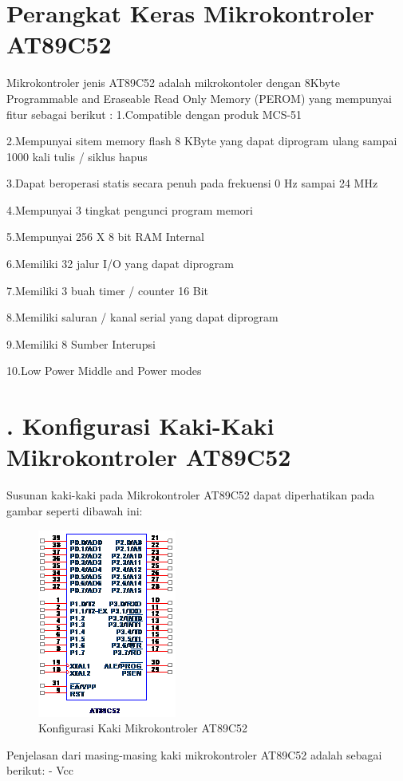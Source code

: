 \documentclass{jtetiproposalskripsi}
\begin{document}
\section{Perangkat Keras Mikrokontroler AT89C52 }
Mikrokontroler jenis AT89C52 adalah mikrokontoler dengan 8Kbyte Programmable and Eraseable Read Only Memory (PEROM) yang mempunyai fitur sebagai berikut :
1.Compatible dengan produk MCS-51

2.Mempunyai sitem memory flash 8 KByte yang dapat diprogram ulang sampai 1000 kali tulis / siklus hapus


3.Dapat  beroperasi statis secara penuh pada frekuensi 0 Hz sampai 24 MHz

4.Mempunyai  3 tingkat pengunci program memori

5.Mempunyai 256 X 8 bit RAM Internal

6.Memiliki 32 jalur I/O yang dapat diprogram

7.Memiliki 3 buah timer / counter 16 Bit

8.Memiliki saluran / kanal serial yang dapat diprogram

9.Memiliki 8 Sumber Interupsi

10.Low Power Middle and Power modes

\section{. Konfigurasi Kaki-Kaki Mikrokontroler AT89C52 }
Susunan kaki-kaki pada Mikrokontroler AT89C52 dapat diperhatikan pada gambar seperti dibawah ini:

\begin{figure}[ht!]
  \centering
    \includegraphics{gambar/1}
    \caption{ Konfigurasi Kaki Mikrokontroler AT89C52 }
    \label{kripto}
\end{figure}

Penjelasan dari masing-masing kaki mikrokontroler AT89C52 adalah sebagai berikut:
-	Vcc
\end{document}
